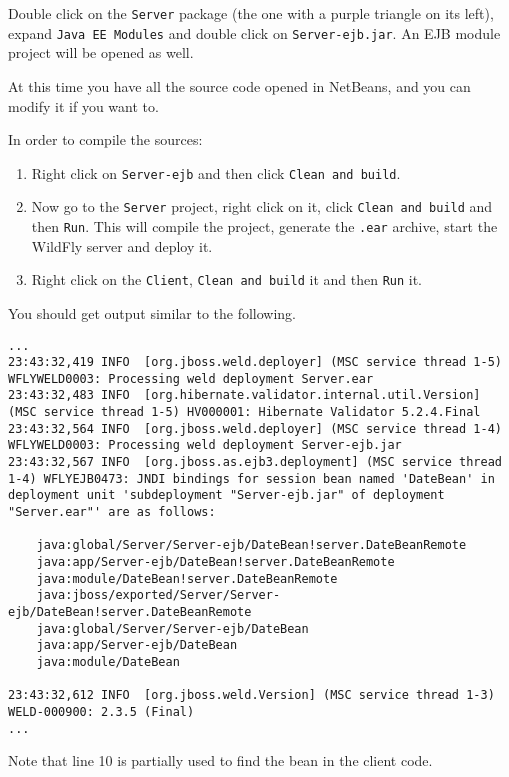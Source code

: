 \documentclass{report}
\begin{document}
Double click on the \texttt{Server} package (the one with a purple triangle on its left), expand \texttt{Java EE Modules} and double click on \texttt{Server-ejb.jar}. An EJB module project will be opened as well. 

At this time you have all the source code opened in NetBeans, and you can modify it if you want to.

In order to compile the sources:
\begin{enumerate}
    \item Right click on \texttt{Server-ejb} and then click \texttt{Clean and build}.
    \item Now go to the \texttt{Server} project, right click on it, click \texttt{Clean and build} and then \texttt{Run}. This will compile the project, generate the \texttt{.ear} archive, start the WildFly server and deploy it.
    \item Right click on the \texttt{Client},
    \texttt{Clean and build} it and then \texttt{Run} it. 
\end{enumerate}  

You should get output similar to the following.
\begin{lstlisting}[language=ksh]
...
23:43:32,419 INFO  [org.jboss.weld.deployer] (MSC service thread 1-5) WFLYWELD0003: Processing weld deployment Server.ear
23:43:32,483 INFO  [org.hibernate.validator.internal.util.Version] (MSC service thread 1-5) HV000001: Hibernate Validator 5.2.4.Final
23:43:32,564 INFO  [org.jboss.weld.deployer] (MSC service thread 1-4) WFLYWELD0003: Processing weld deployment Server-ejb.jar
23:43:32,567 INFO  [org.jboss.as.ejb3.deployment] (MSC service thread 1-4) WFLYEJB0473: JNDI bindings for session bean named 'DateBean' in deployment unit 'subdeployment "Server-ejb.jar" of deployment "Server.ear"' are as follows:

    java:global/Server/Server-ejb/DateBean!server.DateBeanRemote
    java:app/Server-ejb/DateBean!server.DateBeanRemote
    java:module/DateBean!server.DateBeanRemote
    java:jboss/exported/Server/Server-ejb/DateBean!server.DateBeanRemote
    java:global/Server/Server-ejb/DateBean
    java:app/Server-ejb/DateBean
    java:module/DateBean

23:43:32,612 INFO  [org.jboss.weld.Version] (MSC service thread 1-3) WELD-000900: 2.3.5 (Final)
...
\end{lstlisting}

Note that line 10 is partially used to find the bean in the client code. 
\end{document}

